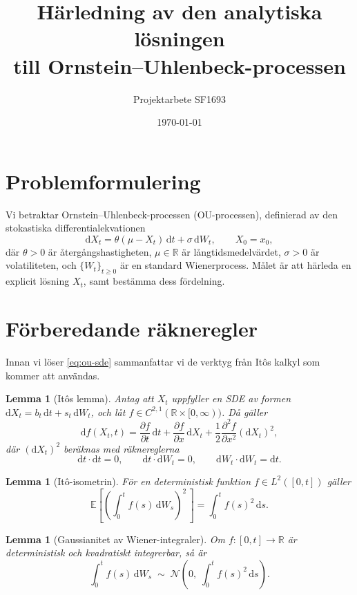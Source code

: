 \documentclass[11pt,a4paper]{article}
\title{Härledning av den analytiska lösningen \\ till Ornstein--Uhlenbeck-processen}
\author{Projektarbete SF1693}
\date{\today}
\newcommand{\R}{\mathbb{R}}
\newcommand{\E}{\mathbb{E}}
\newcommand{\dd}{\mathrm{d}}
\theoremstyle{plain}
\newtheorem{lemma}[theorem]{Lemma}
\theoremstyle{definition}
\theoremstyle{remark}
\begin{document}
\maketitle

\section{Problemformulering}

Vi betraktar Ornstein--Uhlenbeck-processen (OU-processen), definierad av den stokastiska differentialekvationen
\begin{equation}
    \dd X_t = \theta(\mu - X_t)\,\dd t + \sigma\,\dd W_t, \qquad X_0 = x_0,
    \label{eq:ou-sde}
\end{equation}
där $\theta > 0$ är återgångshastigheten, $\mu \in \R$ är långtidsmedelvärdet, $\sigma > 0$ är volatiliteten, och $\{W_t\}_{t \geq 0}$ är en standard Wienerprocess. Målet är att härleda en explicit lösning $X_t$, samt bestämma dess fördelning.

\section{Förberedande räkneregler}

Innan vi löser \eqref{eq:ou-sde} sammanfattar vi de verktyg från Itôs kalkyl som kommer att användas.

\begin{lemma}[Itôs lemma]
\label{lem:ito}
Antag att $X_t$ uppfyller en SDE av formen $\dd X_t = b_t\,\dd t + s_t\,\dd W_t$, och låt $f \in C^{2,1}(\R \times [0,\infty))$. Då gäller
\begin{equation}
    \dd f(X_t, t) = \frac{\partial f}{\partial t}\,\dd t + \frac{\partial f}{\partial x}\,\dd X_t + \frac{1}{2}\frac{\partial^2 f}{\partial x^2}(\dd X_t)^2,
    \label{eq:ito}
\end{equation}
där $(\dd X_t)^2$ beräknas med räknereglerna
\[
    \dd t \cdot \dd t = 0, \qquad \dd t \cdot \dd W_t = 0, \qquad \dd W_t \cdot \dd W_t = \dd t.
\]
\end{lemma}

\begin{lemma}[Itô-isometrin]
\label{lem:isometri}
För en deterministisk funktion $f \in L^2([0,t])$ gäller
\[
    \E\!\left[\left(\int_0^t f(s)\,\dd W_s\right)^{\!2}\,\right] = \int_0^t f(s)^2\,\dd s.
\]
\end{lemma}

\begin{lemma}[Gaussianitet av Wiener-integraler]
\label{lem:gauss}
Om $f \colon [0,t] \to \R$ är deterministisk och kvadratiskt integrerbar, så är
\[
    \int_0^t f(s)\,\dd W_s \;\sim\; \mathcal{N}\!\left(0,\;\int_0^t f(s)^2\,\dd s\right).
\]
\end{lemma}
\end{document}
